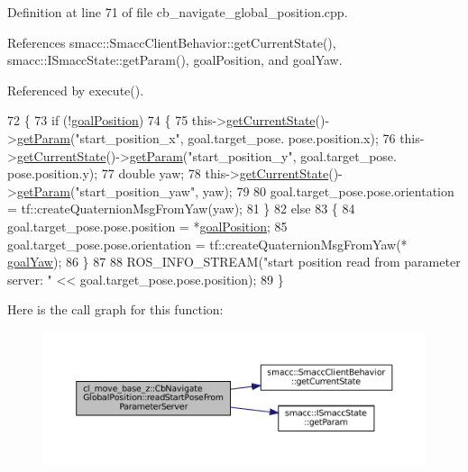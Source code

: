 Definition at line 71 of file cb\+\_\+navigate\+\_\+global\+\_\+position.\+cpp.



References smacc\+::\+Smacc\+Client\+Behavior\+::get\+Current\+State(), smacc\+::\+I\+Smacc\+State\+::get\+Param(), goal\+Position, and goal\+Yaw.



Referenced by execute().


\begin{DoxyCode}
72     \{
73         \textcolor{keywordflow}{if} (!\hyperlink{classcl__move__base__z_1_1CbNavigateGlobalPosition_a51a0266fd9a63e99f26e88933529c559}{goalPosition})
74         \{
75             this->\hyperlink{classsmacc_1_1SmaccClientBehavior_abf6773e4dd948f932f11a346dd6e7c2c}{getCurrentState}()->\hyperlink{classsmacc_1_1ISmaccState_abbb3a24b912c6e8de28f7b86123b6357}{getParam}(\textcolor{stringliteral}{"start\_position\_x"}, goal.target\_pose.
      pose.position.x);
76             this->\hyperlink{classsmacc_1_1SmaccClientBehavior_abf6773e4dd948f932f11a346dd6e7c2c}{getCurrentState}()->\hyperlink{classsmacc_1_1ISmaccState_abbb3a24b912c6e8de28f7b86123b6357}{getParam}(\textcolor{stringliteral}{"start\_position\_y"}, goal.target\_pose.
      pose.position.y);
77             \textcolor{keywordtype}{double} yaw;
78             this->\hyperlink{classsmacc_1_1SmaccClientBehavior_abf6773e4dd948f932f11a346dd6e7c2c}{getCurrentState}()->\hyperlink{classsmacc_1_1ISmaccState_abbb3a24b912c6e8de28f7b86123b6357}{getParam}(\textcolor{stringliteral}{"start\_position\_yaw"}, yaw);
79 
80             goal.target\_pose.pose.orientation = tf::createQuaternionMsgFromYaw(yaw);
81         \}
82         \textcolor{keywordflow}{else}
83         \{
84             goal.target\_pose.pose.position = *\hyperlink{classcl__move__base__z_1_1CbNavigateGlobalPosition_a51a0266fd9a63e99f26e88933529c559}{goalPosition};
85             goal.target\_pose.pose.orientation = tf::createQuaternionMsgFromYaw(*
      \hyperlink{classcl__move__base__z_1_1CbNavigateGlobalPosition_a839900de7f664b27c9be189fadbaa003}{goalYaw});
86         \}
87 
88         ROS\_INFO\_STREAM(\textcolor{stringliteral}{"start position read from parameter server: "} << goal.target\_pose.pose.position);
89     \}
\end{DoxyCode}
Here is the call graph for this function\+:
\nopagebreak
\begin{figure}[H]
\begin{center}
\leavevmode
\includegraphics[width=350pt]{classcl__move__base__z_1_1CbNavigateGlobalPosition_a868b25f238e3781c9a2e44b4e1502fcc_cgraph}
\end{center}
\end{figure}

